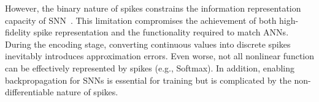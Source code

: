 \documentclass{article}
\theoremstyle{plain}
\theoremstyle{definition}
\theoremstyle{remark}
\begin{document}
However, the binary nature of spikes constrains the information representation capacity of SNN~\citep{auge2021encoding, guo2021coding}. This limitation compromises the achievement of both high-fidelity spike representation and the functionality required to match ANNs.
 During the encoding stage, converting continuous values into discrete spikes inevitably introduces approximation errors. 
Even worse, not all nonlinear function can be effectively represented by spikes (e.g., Softmax). 
In addition, enabling backpropagation for SNNs is essential for training but is complicated by the non-differentiable nature of spikes. 
\end{document}
